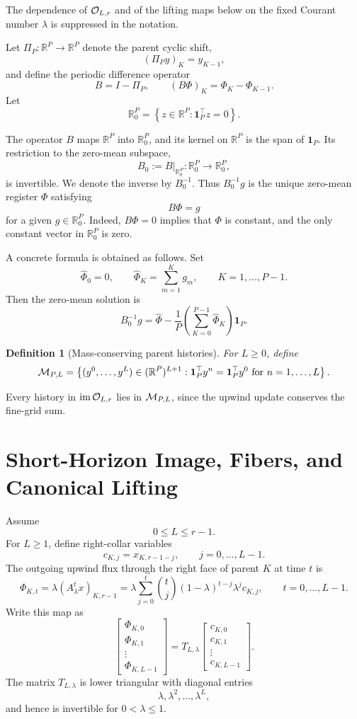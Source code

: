 \documentclass[11pt]{article}
\newtheorem{definition}{Definition}
\newcommand{\R}{\mathbb R}
\DeclareMathOperator{\im}{im}
\begin{document}
The dependence of \({\cal O}_{L,r}\) and of the lifting maps below on the
fixed Courant number \(\lambda\) is suppressed in the notation.

Let \(\Pi_P:\R^P\to\R^P\) denote the parent cyclic shift,
\[
  (\Pi_Py)_K=y_{K-1},
\]
and define the periodic difference operator
\[
  B=I-\Pi_P,
  \qquad
  (B\Phi)_K=\Phi_K-\Phi_{K-1}.
\]
Let
\[
  \R_0^P
  =
  \left\{
  z\in\R^P:\mathbf 1_P^\top z=0
  \right\}.
\]

The operator \(B\) maps \(\R^P\) into \(\R_0^P\), and its kernel on
\(\R^P\) is the span of \(\mathbf 1_P\).  Its restriction to the zero-mean
subspace,
\[
  B_0:=B|_{\R_0^P}:\R_0^P\to\R_0^P,
\]
is invertible.  We denote the inverse by \(B_0^{-1}\).  Thus
\(B_0^{-1}g\) is the unique zero-mean register \(\Phi\) satisfying
\[
  B\Phi=g
\]
for a given \(g\in\R_0^P\).  Indeed, \(B\Phi=0\) implies that \(\Phi\) is
constant, and the only constant vector in \(\R_0^P\) is zero.

A concrete formula is obtained as follows.  Set
\[
  \widehat\Phi_0=0,
  \qquad
  \widehat\Phi_K=\sum_{m=1}^{K}g_m,
  \qquad K=1,\ldots,P-1.
\]
Then the zero-mean solution is
\[
  B_0^{-1}g
  =
  \widehat\Phi
  -
  \frac1P\left(\sum_{K=0}^{P-1}\widehat\Phi_K\right)\mathbf 1_P.
\]

\begin{definition}[Mass-conserving parent histories]
For \(L\ge0\), define
\[
  {\cal M}_{P,L}
  =
  \left\{
  (y^0,\ldots,y^L)\in(\R^P)^{L+1}:
  \mathbf 1_P^\top y^n=\mathbf 1_P^\top y^0
  \text{ for }n=1,\ldots,L
  \right\}.
\]
\end{definition}

Every history in \(\im{\cal O}_{L,r}\) lies in \({\cal M}_{P,L}\), since the
upwind update conserves the fine-grid sum.

\section{Short-Horizon Image, Fibers, and Canonical Lifting}
\label{sec:short-horizon}

Assume
\[
  0\le L\le r-1.
\]
For \(L\ge1\), define right-collar variables
\[
  c_{K,j}=x_{K,r-1-j},
  \qquad
  j=0,\ldots,L-1.
\]
The outgoing upwind flux through the right face of parent \(K\) at time \(t\)
is
\[
  \Phi_{K,t}
  =
  \lambda(A_\lambda^t x)_{K,r-1}
  =
  \lambda
  \sum_{j=0}^{t}
  \binom{t}{j}(1-\lambda)^{t-j}\lambda^j c_{K,j},
  \qquad
  t=0,\ldots,L-1.
\]
Write this map as
\[
  \begin{bmatrix}
  \Phi_{K,0}\\
  \Phi_{K,1}\\
  \vdots\\
  \Phi_{K,L-1}
  \end{bmatrix}
  =
  T_{L,\lambda}
  \begin{bmatrix}
  c_{K,0}\\
  c_{K,1}\\
  \vdots\\
  c_{K,L-1}
  \end{bmatrix}.
\]
The matrix \(T_{L,\lambda}\) is lower triangular with diagonal entries
\[
  \lambda,\lambda^2,\ldots,\lambda^L,
\]
and hence is invertible for \(0<\lambda\le1\).
\end{document}
